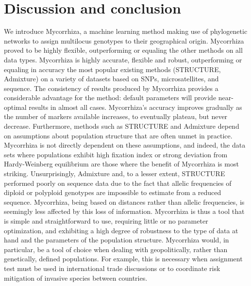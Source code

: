 \documentclass{bioinfo}
\begin{document}
\section{Discussion and conclusion}
We introduce Mycorrhiza, a machine learning method making use of phylogenetic networks to assign multilocus genotypes to their geographical origin. Mycorrhiza proved to be highly flexible, outperforming or equaling the other methods on all data types. Mycorrhiza is highly accurate, flexible and robust, outperforming or equaling in accuracy the most popular existing methods (STRUCTURE, Admixture) on a variety of datasets based on SNPs, microsatellites, and sequence. The consistency of results produced by Mycorrhiza provides a considerable advantage for the method: default parameters will provide near-optimal results in almost all cases. Mycorrhiza’s accuracy improves gradually as the number of markers available increases, to eventually plateau, but never decrease. Furthermore, methods such as STRUCTURE and Admixture depend on assumptions about population structure that are often unmet in practice. Mycorrhiza is not directly dependent on these assumptions, and indeed, the data sets where populations exhibit high fixation index or strong deviation from Hardy-Weinberg equilibrium are those where the benefit of Mycorrhiza is most striking. Unsurprisingly, Admixture and, to a lesser extent, STRUCTURE performed poorly on sequence data due to the fact that allelic frequencies of diploid or polyploid genotypes are impossible to estimate from a reduced sequence. Mycorrhiza, being based on distances rather than allelic frequencies, is seemingly less affected by this loss of information. Mycorrhiza is thus a tool that is simple and straightforward to use, requiring little or no parameter optimization, and exhibiting a high degree of robustness to the type of data at hand and the parameters of the population structure. Mycorrhiza would, in particular, be a tool of choice when dealing with geopolitically, rather than genetically, defined populations. For example, this is necessary when assignment test must be used in international trade discussions or to coordinate risk mitigation of invasive species between countries.\\
\end{document}
